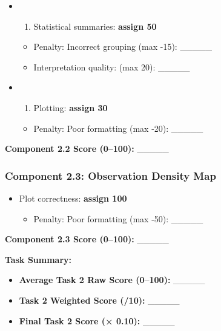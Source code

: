 \documentclass[
  10pt,
]{article}
\providecommand{\tightlist}{%
  \setlength{\itemsep}{0pt}\setlength{\parskip}{0pt}}
\begin{document}
\begin{itemize}
\item
  \begin{enumerate}
  \def\labelenumi{(\arabic{enumi})}
  \tightlist
  \item
    Statistical summaries: \textbf{assign 50}\\
  \end{enumerate}

  \begin{itemize}
  \tightlist
  \item
    Penalty: Incorrect grouping (max -15): \_\_\_\_\_\\
  \item
    Interpretation quality: (max 20): \_\_\_\_\_
  \end{itemize}
\item
  \begin{enumerate}
  \def\labelenumi{(\arabic{enumi})}
  \setcounter{enumi}{1}
  \tightlist
  \item
    Plotting: \textbf{assign 30}\\
  \end{enumerate}

  \begin{itemize}
  \tightlist
  \item
    Penalty: Poor formatting (max -20): \_\_\_\_\_
  \end{itemize}
\end{itemize}

\textbf{Component 2.2 Score (0--100):} \_\_\_\_\_

\subsubsection{Component 2.3: Observation Density
Map}\label{component-2.3-observation-density-map}

\begin{itemize}
\tightlist
\item
  Plot correctness: \textbf{assign 100}

  \begin{itemize}
  \tightlist
  \item
    Penalty: Poor formatting (max -50): \_\_\_\_\_
  \end{itemize}
\end{itemize}

\textbf{Component 2.3 Score (0--100):} \_\_\_\_\_

\textbf{Task Summary:}

\begin{itemize}
\tightlist
\item
  \textbf{Average Task 2 Raw Score (0--100):} \_\_\_\_\_\\
\item
  \textbf{Task 2 Weighted Score (/10):} \_\_\_\_\_\\
\item
  \textbf{Final Task 2 Score (× 0.10):} \_\_\_\_\_
\end{itemize}
\end{document}
